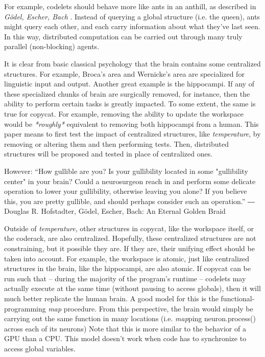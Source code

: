 \documentclass[a4paper]{article}
\begin{document}
    For example, codelets should behave more like ants in an anthill, as described in \emph{Gödel, Escher, Bach} \cite{geb}.
    Instead of querying a global structure (i.e. the queen), ants might query each other, and each carry information about what they've last seen.
    In this way, distributed computation can be carried out through many truly parallel (non-blocking) agents.

    It is clear from basic classical psychology that the brain contains some centralized structures.
    For example, Broca's area and Wernicke's area are specialized for linguistic input and output.
    Another great example is the hippocampi.
    If any of these specialized chunks of brain are surgically removed, for instance, then the ability to perform certain tasks is greatly impacted.
    To some extent, the same is true for copycat.
    For example, removing the ability to update the workspace would be \emph{*roughly*} equivalent to removing both hippocampi from a human.
    This paper means to first test the impact of centralized structures, like \emph{temperature}, by removing or altering them and then performing tests.
    Then, distributed structures will be proposed and tested in place of centralized ones.

    However: “How gullible are you? Is your gullibility located in some "gullibility center" in your brain? Could a neurosurgeon reach in and perform some delicate operation to lower your gullibility, otherwise leaving you alone? If you believe this, you are pretty gullible, and should perhaps consider such an operation.”
― Douglas R. Hofstadter, Gödel, Escher, Bach: An Eternal Golden Braid 

    Outside of \emph{temperature}, other structures in copycat, like the workspace itself, or the coderack, are also centralized.
    Hopefully, these centralized structures are not constraining, but it possible they are.
    If they are, their unifying effect should be taken into account.
    For example, the workspace is atomic, just like centralized structures in the brain, like the hippocampi, are also atomic.
    If copycat can be run such that -- during the majority of the program's runtime -- codelets may actually execute at the same time (without pausing to access globals), then it will much better replicate the human brain.
    A good model for this is the functional-programming \emph{map} procedure.
    From this perspective, the brain would simply be carrying out the same function in many locations (i.e. \emph{map}ping neuron.process() across each of its neurons)
    Note that this is more similar to the behavior of a GPU than a CPU.
    This model doesn't work when code has to synchronize to access global variables.
\end{document}
